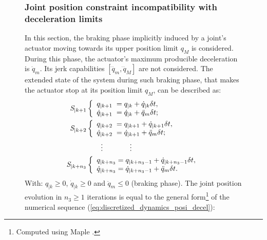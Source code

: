 \begin{figure}[!htbp]
\subsubsection{Joint position constraint incompatibility with deceleration limits}
\label{subsec:case1}
In this section, the braking phase implicitly induced by a joint's actuator moving towards its upper position limit $q_{M}$ is considered. During this phase, the actuator's maximum producible deceleration is $\ddot{q}_{m}$. Its jerk capabilities $[\dddot{q}_{m}, \dddot{q}_{M}]$ are not considered. The extended state of the system during such braking phase, that makes the actuator stop at its position limit $q_{M}$, can be described as:
\begin{equation} 
\begin{split}
\textit{S}_{|k+1}&\left\{\begin{array}{lcl}
q_{|k+1} \hspace{1mm}= q_{|k} + \dot{q}_{|k} \delta t, \\
\dot{q}_{|k+1} \hspace{1mm}= \dot{q}_{|k} + \ddot{q}_{m} \delta t;
\end{array}\right.\\
\textit{S}_{|k+2}&\left\{\begin{array}{lcl}
q_{|k+2} \hspace{1mm}= q_{|k+1} + \dot{q}_{|k+1} \delta t, \\
\dot{q}_{|k+2} \hspace{1mm}= \dot{q}_{|k+1} + \ddot{q}_{m} \delta t;
\end{array}\right.\\
&\hspace{7mm}\vdots\ \hspace{12mm}\vdots\ \\
\textit{S}_{|k+n_{3}}&\left\{\begin{array}{lcl}
q_{|k+n_{3}} = q_{|k+n_{3}-1} + \dot{q}_{|k+n_{3}-1} \delta t, \\
\dot{q}_{|k+n_{3}} = \dot{q}_{|k+n_{3}-1} + \ddot{q}_{m} \delta t.
\end{array}\right.
\end{split}
\label{eq:discretized_dynamics_posi_decel}
\end{equation}
With: $q_{|k} \geq 0$, $\dot{q}_{|k} \geq 0$ and  $\ddot{q}_{m} \leq 0$ (braking phase). The joint position evolution in $n_3  \geq 1$ iterations is equal to the general form\footnote{Computed using Maple \cite{maple}.} of the numerical sequence (\ref{eq:discretized_dynamics_posi_decel}):

\end{figure}
